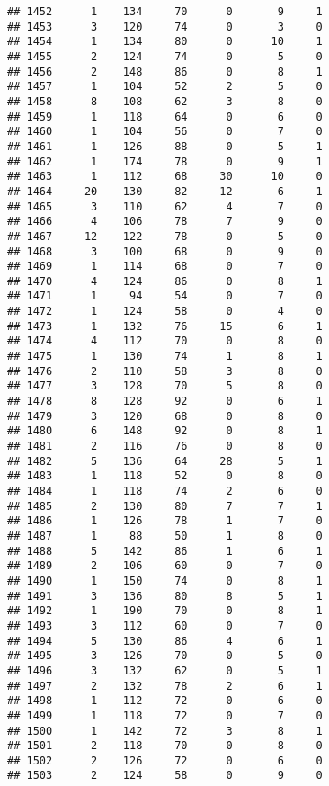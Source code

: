 \documentclass[
]{article}
\begin{document}
\begin{verbatim}
## 1452      1    134     70      0       9     1
## 1453      3    120     74      0       3     0
## 1454      1    134     80      0      10     1
## 1455      2    124     74      0       5     0
## 1456      2    148     86      0       8     1
## 1457      1    104     52      2       5     0
## 1458      8    108     62      3       8     0
## 1459      1    118     64      0       6     0
## 1460      1    104     56      0       7     0
## 1461      1    126     88      0       5     1
## 1462      1    174     78      0       9     1
## 1463      1    112     68     30      10     0
## 1464     20    130     82     12       6     1
## 1465      3    110     62      4       7     0
## 1466      4    106     78      7       9     0
## 1467     12    122     78      0       5     0
## 1468      3    100     68      0       9     0
## 1469      1    114     68      0       7     0
## 1470      4    124     86      0       8     1
## 1471      1     94     54      0       7     0
## 1472      1    124     58      0       4     0
## 1473      1    132     76     15       6     1
## 1474      4    112     70      0       8     0
## 1475      1    130     74      1       8     1
## 1476      2    110     58      3       8     0
## 1477      3    128     70      5       8     0
## 1478      8    128     92      0       6     1
## 1479      3    120     68      0       8     0
## 1480      6    148     92      0       8     1
## 1481      2    116     76      0       8     0
## 1482      5    136     64     28       5     1
## 1483      1    118     52      0       8     0
## 1484      1    118     74      2       6     0
## 1485      2    130     80      7       7     1
## 1486      1    126     78      1       7     0
## 1487      1     88     50      1       8     0
## 1488      5    142     86      1       6     1
## 1489      2    106     60      0       7     0
## 1490      1    150     74      0       8     1
## 1491      3    136     80      8       5     1
## 1492      1    190     70      0       8     1
## 1493      3    112     60      0       7     0
## 1494      5    130     86      4       6     1
## 1495      3    126     70      0       5     0
## 1496      3    132     62      0       5     1
## 1497      2    132     78      2       6     1
## 1498      1    112     72      0       6     0
## 1499      1    118     72      0       7     0
## 1500      1    142     72      3       8     1
## 1501      2    118     70      0       8     0
## 1502      2    126     72      0       6     0
## 1503      2    124     58      0       9     0

\end{verbatim}
\end{document}
